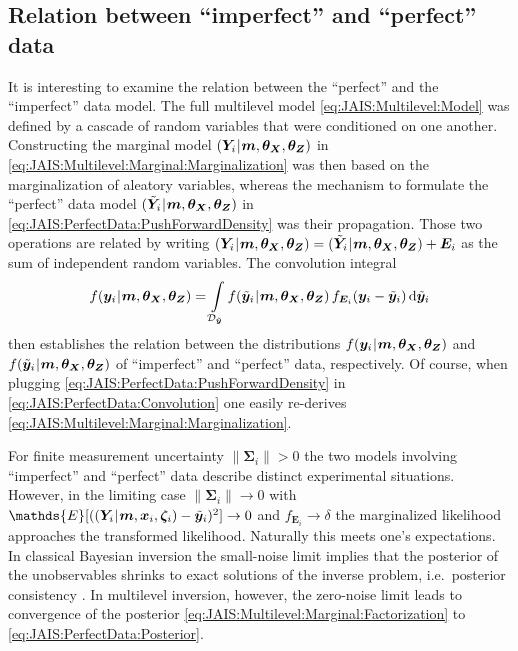 \subsection{Relation between ``imperfect'' and ``perfect'' data}
It is interesting to examine the relation between the ``perfect'' and the ``imperfect'' data model.
The full multilevel model \cref{eq:JAIS:Multilevel:Model} was defined by a cascade of random variables that were conditioned on one another.
Constructing the marginal model \((\bm{Y}_i {\:\!}|{\:\!} \bm{m},\bm{\theta}_{\bm{X}},\bm{\theta}_{\bm{Z}})\) in \cref{eq:JAIS:Multilevel:Marginal:Marginalization} was then based on the marginalization of aleatory variables,
whereas the mechanism to formulate the ``perfect'' data model \((\tilde{\bm{Y}}_i {\:\!}|{\:\!} \bm{m},\bm{\theta}_{\bm{X}},\bm{\theta}_{\bm{Z}})\) in \cref{eq:JAIS:PerfectData:PushForwardDensity} was their propagation.
Those two operations are related by writing \((\bm{Y}_i {\:\!}|{\:\!} \bm{m},\bm{\theta}_{\bm{X}},\bm{\theta}_{\bm{Z}}) = (\tilde{\bm{Y}}_i {\:\!}|{\:\!} \bm{m},\bm{\theta}_{\bm{X}},\bm{\theta}_{\bm{Z}}) + \bm{E}_i\)
as the sum of independent random variables.
The convolution integral
\begin{equation} \label{eq:JAIS:PerfectData:Convolution}
  f (\bm{y}_i {\:\!}|{\:\!} \bm{m},\bm{\theta}_{\bm{X}},\bm{\theta}_{\bm{Z}}) 
  = \int\limits_{\mathcal{D}_{\tilde{\bm{y}}}} f (\tilde{\bm{y}}_i {\:\!}|{\:\!} \bm{m},\bm{\theta}_{\bm{X}},\bm{\theta}_{\bm{Z}}) \, f_{\bm{E}_i} (\bm{y}_i - \tilde{\bm{y}}_i) \, \mathrm{d} \tilde{\bm{y}}_i
\end{equation}
then establishes the relation between the distributions \(f(\bm{y}_i {\:\!}|{\:\!} \bm{m},\bm{\theta}_{\bm{X}},\bm{\theta}_{\bm{Z}})\)
and \(f (\tilde{\bm{y}}_i {\:\!}|{\:\!} \bm{m},\bm{\theta}_{\bm{X}},\bm{\theta}_{\bm{Z}})\) of ``imperfect'' and ``perfect'' data, respectively.
Of course, when plugging \cref{eq:JAIS:PerfectData:PushForwardDensity} in \cref{eq:JAIS:PerfectData:Convolution} one easily re-derives \cref{eq:JAIS:Multilevel:Marginal:Marginalization}.
\par %
For finite measurement uncertainty \(\lVert \bm{\Sigma}_i \rVert > 0\) the two models involving ``imperfect'' and ``perfect'' data describe distinct experimental situations.
However, in the limiting case \(\lVert \bm{\Sigma}_i \rVert \rightarrow 0\) with \(\mathds{E}[((\bm{Y}_i \cond \bm{m},\bm{x}_i,\bm{\zeta}_i) -\perfect{\bm{y}}_i)^2] \rightarrow 0\) and \(f_{\bm{E}_i} \rightarrow \delta\)
the marginalized likelihood approaches the transformed likelihood.
Naturally this meets one's expectations.
In classical Bayesian inversion the small-noise limit implies that the posterior of the unobservables shrinks to exact solutions of the inverse problem,
i.e.\ posterior consistency \cite{Bayesian:Diaconis1986,Bayesian:Vollmer2013}.
In multilevel inversion, however, the zero-noise limit leads to convergence of the posterior \cref{eq:JAIS:Multilevel:Marginal:Factorization} to \cref{eq:JAIS:PerfectData:Posterior}.

